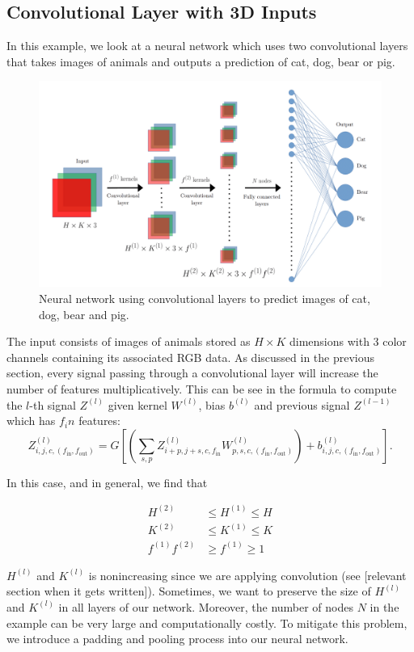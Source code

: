 \subsection{Convolutional Layer with 3D Inputs}
\begin{example}\label{ex:CNNanimal}
In this example, we look at a neural network which uses two convolutional layers that takes images of animals and outputs a prediction of cat, dog, bear or pig.

\begin{figure}[H]
    \centering
    \includegraphics[scale=0.35]{images/Chapter 11/convolutionalNNexample.png}
    \caption{Neural network using convolutional layers to predict images of cat, dog, bear and pig.}
    \label{fig:11.1}
\end{figure}
The input consists of images of animals stored as $H\times K$ dimensions with $3$ color channels containing its associated RGB data. As discussed in the previous section, every signal passing through a convolutional layer will increase the number of features multiplicatively. This can be see in the formula to compute the $l$-th signal $Z^{(l)}$ given kernel $W^{(l)}$, bias $b^{(l)}$ and previous signal $Z^{(l-1)}$ which has $f_in$ features:
$$Z_{i,j,c,(f_{\text{in}},f_{\text{out}})}^{(l)} = G \left[ \left( \sum_{s,p}Z^{(l)}_{i+p,j+s,c,f_{\text{in}}} W_{p,s,c,(f_{\text{in}},f_{\text{out}})}^{(l)} \right) + b^{(l)}_{i,j,c,(f_{\text{in}},f_{\text{out}})}\right].$$

\noindent In this case, and in general, we find that
\begin{ceqn}
    \begin{align*}
        H^{(2)} &\leq H^{(1)} \leq H\\
        K^{(2)} &\leq K^{(1)} \leq K\\
        f^{(1)}f^{(2)} &\geq f^{(1)} \geq 1
    \end{align*}
\end{ceqn}
$H^{(l)}$ and $K^{(l)}$ is nonincreasing since we are applying convolution (see [relevant section when it gets written]). Sometimes, we want to preserve the size of $H^{(l)}$ and $K^{(l)}$ in all layers of our network. Moreover, the number of nodes $N$ in the example can be very large and computationally costly. To mitigate this problem, we introduce a padding and pooling process into our neural network.\\
\end{example}
